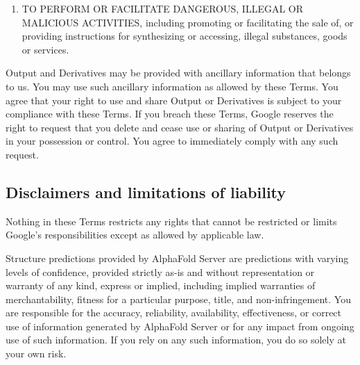 \documentclass[
]{article}
\providecommand{\tightlist}{%
  \setlength{\itemsep}{0pt}\setlength{\parskip}{0pt}}
\begin{document}
\begin{enumerate}
  \begin{enumerate}
  \def\labelenumii{\arabic{enumii}.}
  \tightlist
  \item
    misrepresenting your relationship with Google - including by using
    Google's trademarks, trade names, logos or suggesting endorsement by
    Google without Google's permission to do so - nothing in these Terms
    grants such permission;
  \item
    misrepresenting the origin of Output or Derivatives;
  \item
    distributing misleading claims of expertise or capability made
    particularly in sensitive areas (e.g., health); or
  \item
    making decisions in domains that affect material or individual
    rights or well-being (e.g., healthcare).
  \end{enumerate}
\item
  TO PERFORM OR FACILITATE DANGEROUS, ILLEGAL OR MALICIOUS ACTIVITIES,
  including promoting or facilitating the sale of, or providing
  instructions for synthesizing or accessing, illegal substances, goods
  or services.
\end{enumerate}

Output and Derivatives may be provided with ancillary information that
belongs to us. You may use such ancillary information as allowed by
these Terms. You agree that your right to use and share Output or
Derivatives is subject to your compliance with these Terms. If you
breach these Terms, Google reserves the right to request that you delete
and cease use or sharing of Output or Derivatives in your possession or
control. You agree to immediately comply with any such request.

\subsection{Disclaimers and limitations of
liability}\label{disclaimers-and-limitations-of-liability}

Nothing in these Terms restricts any rights that cannot be restricted or
limits Google's responsibilities except as allowed by applicable law.

Structure predictions provided by AlphaFold Server are predictions with
varying levels of confidence, provided strictly as-is and without
representation or warranty of any kind, express or implied, including
implied warranties of merchantability, fitness for a particular purpose,
title, and non-infringement. You are responsible for the accuracy,
reliability, availability, effectiveness, or correct use of information
generated by AlphaFold Server or for any impact from ongoing use of such
information. If you rely on any such information, you do so solely at
your own risk.
\end{document}
